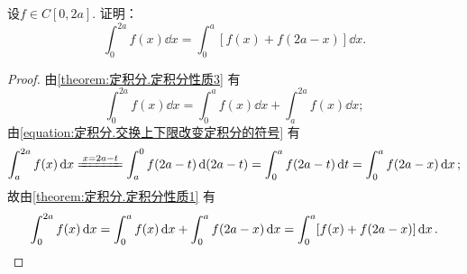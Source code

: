 \begin{example}
设\(f \in C[0,2a]\).
证明：\begin{equation}
	\int_0^{2a} f(x) \dd{x} = \int_0^a [f(x) + f(2a-x)] \dd{x}.
\end{equation}
\begin{proof}
由\cref{theorem:定积分.定积分性质3} 有\[
	\int_0^{2a} f(x) \dd{x}
	= \int_0^a f(x) \dd{x} + \int_a^{2a} f(x) \dd{x};
\]
由\cref{equation:定积分.交换上下限改变定积分的符号} 有\[
	\int_a^{2a} f(x) \dd{x}
	\xlongequal{x=2a-t} \int_a^0 f(2a-t) \dd(2a-t)
	= \int_0^a f(2a-t) \dd{t}
	= \int_0^a f(2a-x) \dd{x};
\]
故由\cref{theorem:定积分.定积分性质1} 有\[
	\int_0^{2a} f(x) \dd{x}
	= \int_0^a f(x) \dd{x} + \int_0^a f(2a-x) \dd{x}
	= \int_0^a [f(x) + f(2a-x)] \dd{x}.
	\qedhere
\]
\end{proof}
\end{example}
